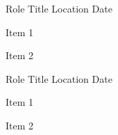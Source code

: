 
\begin{cventries}

  \cventry
    {Role} %
    {Title} %
    {Location} %
    {Date} %
    {
      \begin{cvitems} %
        \item {Item 1}
        \item {Item 2}
      \end{cvitems}
    }

  \cventry
    {Role} %
    {Title} %
    {Location} %
    {Date} %
    {
      \begin{cvitems} %
        \item {Item 1}
        \item {Item 2}
      \end{cvitems}
    }

\end{cventries}
